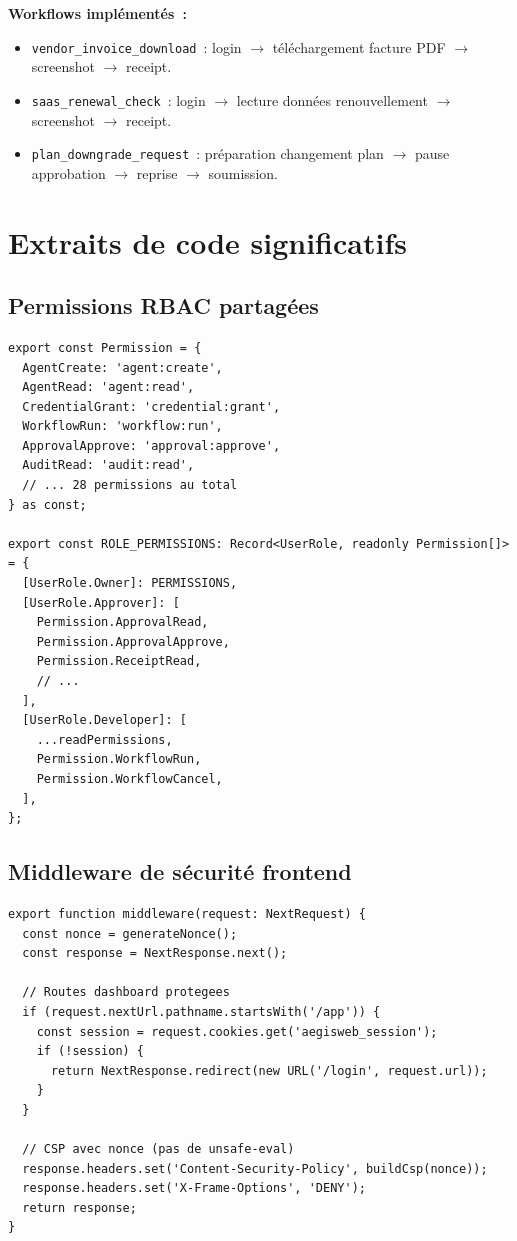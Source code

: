 \textbf{Workflows implémentés~:}
\begin{itemize}[leftmargin=1.8cm, itemsep=3pt]
  \item \texttt{vendor\_invoice\_download}~: login $\rightarrow$ téléchargement
    facture PDF $\rightarrow$ screenshot $\rightarrow$ receipt.
  \item \texttt{saas\_renewal\_check}~: login $\rightarrow$ lecture données
    renouvellement $\rightarrow$ screenshot $\rightarrow$ receipt.
  \item \texttt{plan\_downgrade\_request}~: préparation changement plan
    $\rightarrow$ pause approbation $\rightarrow$ reprise $\rightarrow$ soumission.
\end{itemize}

\section{Extraits de code significatifs}

\subsection{Permissions RBAC partagées}

\begin{lstlisting}[style=tsstyle,
  caption={libs/domain — Définition des permissions et rôles},
  label={lst:permissions}]
export const Permission = {
  AgentCreate: 'agent:create',
  AgentRead: 'agent:read',
  CredentialGrant: 'credential:grant',
  WorkflowRun: 'workflow:run',
  ApprovalApprove: 'approval:approve',
  AuditRead: 'audit:read',
  // ... 28 permissions au total
} as const;

export const ROLE_PERMISSIONS: Record<UserRole, readonly Permission[]> = {
  [UserRole.Owner]: PERMISSIONS,
  [UserRole.Approver]: [
    Permission.ApprovalRead,
    Permission.ApprovalApprove,
    Permission.ReceiptRead,
    // ...
  ],
  [UserRole.Developer]: [
    ...readPermissions,
    Permission.WorkflowRun,
    Permission.WorkflowCancel,
  ],
};
\end{lstlisting}

\subsection{Middleware de sécurité frontend}

\begin{lstlisting}[style=tsstyle,
  caption={apps/web/middleware.ts — Protection routes /app et CSP},
  label={lst:middleware}]
export function middleware(request: NextRequest) {
  const nonce = generateNonce();
  const response = NextResponse.next();

  // Routes dashboard protegees
  if (request.nextUrl.pathname.startsWith('/app')) {
    const session = request.cookies.get('aegisweb_session');
    if (!session) {
      return NextResponse.redirect(new URL('/login', request.url));
    }
  }

  // CSP avec nonce (pas de unsafe-eval)
  response.headers.set('Content-Security-Policy', buildCsp(nonce));
  response.headers.set('X-Frame-Options', 'DENY');
  return response;
}
\end{lstlisting}

